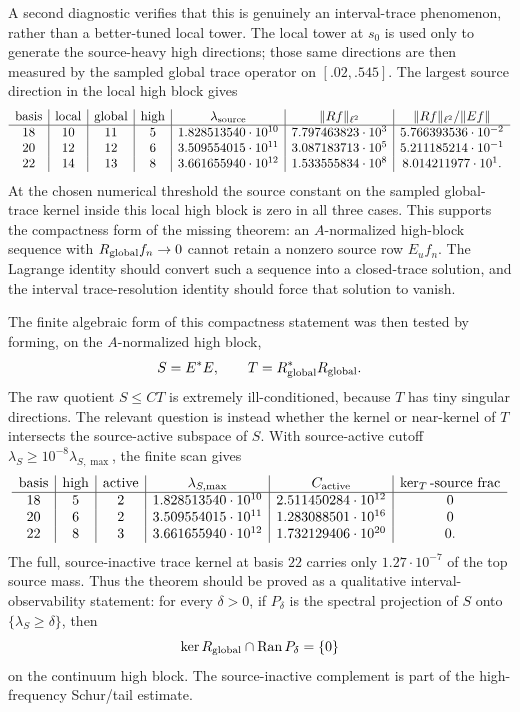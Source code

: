 \documentclass[11pt]{article}
\begin{document}
A second diagnostic verifies that this is genuinely an interval-trace
phenomenon, rather than a better-tuned local tower.  The local tower at \(s_0\)
is used only to generate the source-heavy high directions; those same
directions are then measured by the sampled global trace operator on
\([.02,.545]\).  The largest source direction in the local high block gives
\[
\begin{array}{c|c|c|c|c|c|c}
\operatorname{basis}&\operatorname{local}&\operatorname{global}&
\operatorname{high}&\lambda_{\rm source}&\|Rf\|_{\ell^2}&
\|Rf\|_{\ell^2}/\|E f\|\\\hline
18&10&11&5&1.828513540\cdot10^{10}&7.797463823\cdot10^3&
5.766393536\cdot10^{-2}\\
20&12&12&6&3.509554015\cdot10^{11}&3.087183713\cdot10^5&
5.211185214\cdot10^{-1}\\
22&14&13&8&3.661655940\cdot10^{12}&1.533555834\cdot10^8&
8.014211977\cdot10^{1}.
\end{array}
\]
At the chosen numerical threshold the source constant on the sampled
global-trace kernel inside this local high block is zero in all three cases.
This supports the compactness form of the missing theorem: an \(A\)-normalized
high-block sequence with \(R_{\rm global}f_n\to0\) cannot retain a nonzero
source row \(E_u f_n\).  The Lagrange identity should convert such a sequence
into a closed-trace solution, and the interval trace-resolution identity should
force that solution to vanish.

The finite algebraic form of this compactness statement was then tested by
forming, on the \(A\)-normalized high block,
\[
  S=E^\ast E,\qquad T=R_{\rm global}^\ast R_{\rm global}.
\]
The raw quotient \(S\le C T\) is extremely ill-conditioned, because \(T\) has
tiny singular directions.  The relevant question is instead whether the kernel
or near-kernel of \(T\) intersects the source-active subspace of \(S\).  With
source-active cutoff \(\lambda_S\ge 10^{-8}\lambda_{S,\max}\), the finite scan
gives
\[
\begin{array}{c|c|c|c|c|c}
\operatorname{basis}&\operatorname{high}&\operatorname{active}&
\lambda_{S,\max}&C_{\rm active}&
\operatorname{ker}_T\operatorname{-source\ frac}\\\hline
18&5&2&1.828513540\cdot10^{10}&2.511450284\cdot10^{12}&0\\
20&6&2&3.509554015\cdot10^{11}&1.283088501\cdot10^{16}&0\\
22&8&3&3.661655940\cdot10^{12}&1.732129406\cdot10^{20}&0.
\end{array}
\]
The full, source-inactive trace kernel at basis \(22\) carries only
\(1.27\cdot10^{-7}\) of the top source mass.  Thus the theorem should be
proved as a qualitative interval-observability statement: for every
\(\delta>0\), if \(P_\delta\) is the spectral projection of \(S\) onto
\(\{\lambda_S\ge\delta\}\), then
\[
  \ker R_{\rm global}\cap \operatorname{Ran}P_\delta=\{0\}
\]
on the continuum high block.  The source-inactive complement is part of the
high-frequency Schur/tail estimate.
\end{document}
